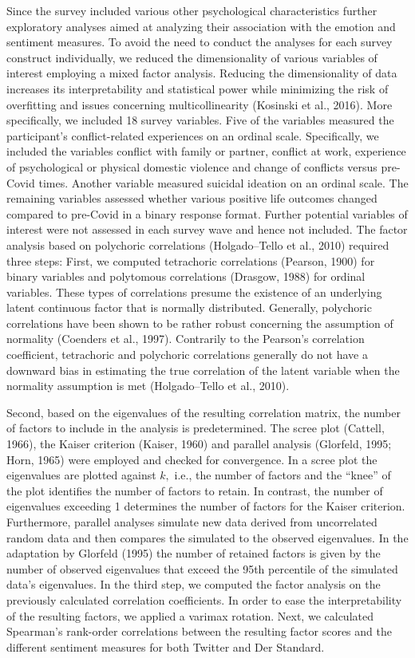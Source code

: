 \documentclass[
  english,
  jou,floatsintext]{apa7}
\begin{document}
Since the survey included various other psychological characteristics further exploratory analyses aimed at analyzing their association with the emotion and sentiment measures. To avoid the need to conduct the analyses for each survey construct individually, we reduced the dimensionality of various variables of interest employing a mixed factor analysis. Reducing the dimensionality of data increases its interpretability and statistical power while minimizing the risk of overfitting and issues concerning multicollinearity (Kosinski et al., 2016). More specifically, we included 18 survey variables. Five of the variables measured the participant's conflict-related experiences on an ordinal scale. Specifically, we included the variables conflict with family or partner, conflict at work, experience of psychological or physical domestic violence and change of conflicts versus pre-Covid times. Another variable measured suicidal ideation on an ordinal scale. The remaining variables assessed whether various positive life outcomes changed compared to pre-Covid in a binary response format. Further potential variables of interest were not assessed in each survey wave and hence not included. The factor analysis based on polychoric correlations (Holgado--Tello et al., 2010) required three steps: First, we computed tetrachoric correlations (Pearson, 1900) for binary variables and polytomous correlations (Drasgow, 1988) for ordinal variables. These types of correlations presume the existence of an underlying latent continuous factor that is normally distributed. Generally, polychoric correlations have been shown to be rather robust concerning the assumption of normality (Coenders et al., 1997). Contrarily to the Pearson's correlation coefficient, tetrachoric and polychoric correlations generally do not have a downward bias in estimating the true correlation of the latent variable when the normality assumption is met (Holgado--Tello et al., 2010).

Second, based on the eigenvalues of the resulting correlation matrix, the number of factors to include in the analysis is predetermined. The scree plot (Cattell, 1966), the Kaiser criterion (Kaiser, 1960) and parallel analysis (Glorfeld, 1995; Horn, 1965) were employed and checked for convergence. In a scree plot the eigenvalues are plotted against \(k,\) i.e., the number of factors and the ``knee'' of the plot identifies the number of factors to retain. In contrast, the number of eigenvalues exceeding 1 determines the number of factors for the Kaiser criterion. Furthermore, parallel analyses simulate new data derived from uncorrelated random data and then compares the simulated to the observed eigenvalues. In the adaptation by Glorfeld (1995) the number of retained factors is given by the number of observed eigenvalues that exceed the 95th percentile of the simulated data's eigenvalues. In the third step, we computed the factor analysis on the previously calculated correlation coefficients. In order to ease the interpretability of the resulting factors, we applied a varimax rotation.
Next, we calculated Spearman's rank-order correlations between the resulting factor scores and the different sentiment measures for both Twitter and Der Standard.
\end{document}
